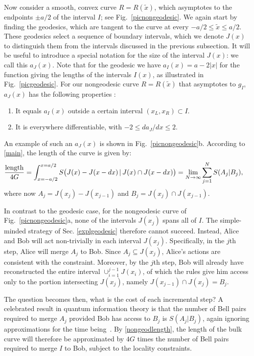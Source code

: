 \documentclass[12pt]{article}
\newcommand{\figref}[1]{Fig.~\ref{#1}}
\begin{document}
Now consider a smooth, convex curve $R = R(\tilde{x})$, which asymptotes to the endpoints $\pm a/2$ of the interval $I$; see Fig.~\ref{picnongeodesic}. We again start by finding the geodesics, which are tangent to the curve at every $-a/2 \leq \tilde{x} \leq a/2$. These geodesics select a sequence of boundary intervals, which we denote $J(x)$ to distinguish them from the intervals discussed in the previous subsection. It will be useful to introduce a special notation for the size of the interval $J(x)$: we call this $a_J(x)$. Note that for the geodesic we have $a_I(x) = a - 2|x|$ for the function giving the lengths of the intervals $I(x)$, as illustrated in \figref{picgeodesic}. For our nongeodesic curve $R = R(\tilde{x})$ that asymptotes to $g_I$, $a_J(x)$ has the following properties \cite{lampros}:
\begin{enumerate}
\item It equals $a_I(x)$ outside a certain interval $(x_L, x_R) \subset I$.
\item It is everywhere differentiable, with $-2 \leq da_J/dx \leq 2$.
\end{enumerate}
An example of such an $a_J(x)$ is shown in Fig.~\ref{picnongeodesic}b. According to \eqref{main}, the length of the curve is given by:
\begin{align}
\frac{\rm length}{4G} &= %
\int_{x=-a/2}^{x=a/2} S\big( J(x) - J(x-dx)\, |\,  J(x) \cap J(x-dx) \big)
= \lim_{N\rightarrow\infty} \sum_{j=1}^N S(A_j | B_j),
\label{nongeodlength}
\end{align}
where now $A_j = J(x_j) - J(x_{j-1})$ and $B_j = J(x_j) \cap J(x_{j-1})$.

In contrast to the geodesic case, for the nongeodesic curve of \figref{picnongeodesic}a, none of the intervals $J(x_j)$ spans all of $I$. The simple-minded strategy of Sec. \ref{explgeodesic} therefore cannot succeed. Instead, Alice and Bob will act non-trivially in each interval $J(x_j)$. Specifically, in the $j$th step, Alice will merge $A_j$ to Bob. Since $A_j \subseteq J(x_j)$, Alice's actions are consistent with the constraint. Moreover, by the $j$th step, Bob will already have reconstructed the entire interval $\cup_{i=1}^{j-1} J(x_i)$, of which the rules give him access only to the portion intersecting $J(x_j)$, namely $J(x_{j-1}) \cap J(x_j) = B_j$.

The question becomes then, what is the cost of each incremental step? A celebrated result in quantum information theory is that the number of Bell pairs required to merge $A_j$ provided Bob has access to $B_j$ is $S(A_j | B_j)$, again ignoring approximations for the time being~\cite{naturepaper,horodecki2007quantum}. By \eqref{nongeodlength}, the length of the bulk curve will therefore be approximated by $4 G$ times the number of Bell pairs required to merge $I$ to Bob, subject to the locality constraints.
\end{document}
